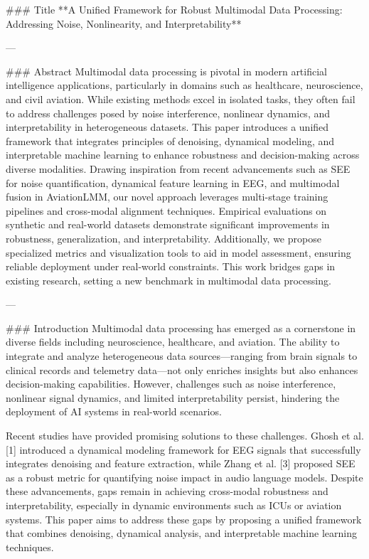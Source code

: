 ### Title  
**A Unified Framework for Robust Multimodal Data Processing: Addressing Noise, Nonlinearity, and Interpretability**

---

### Abstract  
Multimodal data processing is pivotal in modern artificial intelligence applications, particularly in domains such as healthcare, neuroscience, and civil aviation. While existing methods excel in isolated tasks, they often fail to address challenges posed by noise interference, nonlinear dynamics, and interpretability in heterogeneous datasets. This paper introduces a unified framework that integrates principles of denoising, dynamical modeling, and interpretable machine learning to enhance robustness and decision-making across diverse modalities. Drawing inspiration from recent advancements such as SEE for noise quantification, dynamical feature learning in EEG, and multimodal fusion in AviationLMM, our novel approach leverages multi-stage training pipelines and cross-modal alignment techniques. Empirical evaluations on synthetic and real-world datasets demonstrate significant improvements in robustness, generalization, and interpretability. Additionally, we propose specialized metrics and visualization tools to aid in model assessment, ensuring reliable deployment under real-world constraints. This work bridges gaps in existing research, setting a new benchmark in multimodal data processing.

---

### Introduction  
Multimodal data processing has emerged as a cornerstone in diverse fields including neuroscience, healthcare, and aviation. The ability to integrate and analyze heterogeneous data sources—ranging from brain signals to clinical records and telemetry data—not only enriches insights but also enhances decision-making capabilities. However, challenges such as noise interference, nonlinear signal dynamics, and limited interpretability persist, hindering the deployment of AI systems in real-world scenarios.

Recent studies have provided promising solutions to these challenges. Ghosh et al. [1] introduced a dynamical modeling framework for EEG signals that successfully integrates denoising and feature extraction, while Zhang et al. [3] proposed SEE as a robust metric for quantifying noise impact in audio language models. Despite these advancements, gaps remain in achieving cross-modal robustness and interpretability, especially in dynamic environments such as ICUs or aviation systems. This paper aims to address these gaps by proposing a unified framework that combines denoising, dynamical analysis, and interpretable machine learning techniques.

